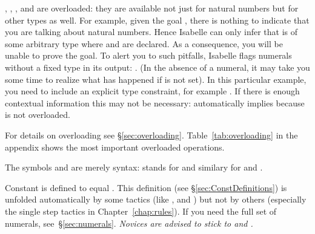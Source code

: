 \begin{isabellebody}
\begin{isamarkuptext}
\begin{warn}
  , ,
  ,  and
   are overloaded: they are available
  not just for natural numbers but for other types as well.
  For example, given the goal , there is nothing to indicate
  that you are talking about natural numbers. Hence Isabelle can only infer
  that  is of some arbitrary type where  and \isa{{\isacharplus}} are
  declared. As a consequence, you will be unable to prove the
  goal. To alert you to such pitfalls, Isabelle flags numerals without a
  fixed type in its output: . (In the absence of a numeral,
  it may take you some time to realize what has happened if  is not set).  In this particular example, you need to include
  an explicit type constraint, for example . If there
  is enough contextual information this may not be necessary:  automatically implies  because  is not
  overloaded.

  For details on overloading see \S\ref{sec:overloading}.
  Table~\ref{tab:overloading} in the appendix shows the most important
  overloaded operations.
\end{warn}
\begin{warn}
  The symbols  and
   are merely syntax: 
  stands for  and similary for \isa{{\isasymge}} and
  \isa{{\isasymle}}.
\end{warn}
\begin{warn}
  Constant  is defined to equal . This definition
  (see \S\ref{sec:ConstDefinitions}) is unfolded automatically by some
  tactics (like ,  and ) but not by
  others (especially the single step tactics in Chapter~\ref{chap:rules}).
  If you need the full set of numerals, see~\S\ref{sec:numerals}.
  \emph{Novices are advised to stick to  and .}
\end{warn}


\end{isamarkuptext}
\end{isabellebody}
